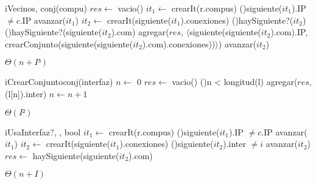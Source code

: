 \begin{Algoritmos}
  \begin{algoritmo}{iVecinos}{, }{conj(compu)}{}
    $res \gets$ vacio() 
     $it_{1} \gets$ crearIt(r.compus) 
    \While(){siguiente($it_{1}$).IP $\neq c$.IP}{
      avanzar($it_{1}$) 
    }
     $it_{2} \gets$ crearIt(siguiente($it_{1}$).conexiones) 
    \While(){haySiguiente?($it_{2}$)}{
      \If(){haySiguiente?(siguiente($it_{2}$).com)}{
        agregar($res$, $\langle$siguiente(siguiente($it_{2}$).com).IP, crearConjunto(siguiente(siguiente($it_{2}$).com).conexiones))$\rangle$)
      }
      avanzar($it_{2}$)
    }
  \end{algoritmo}
   \datosAlgoritmo{} %
  {} %
  {} %
  {$\Theta(n+I³)$} %
  {} %
  
   \begin{algoritmo}{iCrearConjunto}{}{conj(interfaz)}{}
     $n \gets$ 0
    $res \gets$ vacio()
   \While(){n < longitud(l)}{
      agregar($res$, (l[n]).inter)
      $n \gets n+1$
    }
  \end{algoritmo} 
  {} %
  {} %
  {$\Theta(I²)$} %
  {} %

  \begin{algoritmo}{iUsaInterfaz?}{, , }{bool}{}
     $it_{1} \gets$ crearIt(r.compus)
    \While(){siguiente($it_{1}$).IP $\neq c$.IP}{
      avanzar($it_{1}$)
    }
     $it_{2} \gets$ crearIt(siguiente($it_{1}$).conexiones)
    \While(){siguiente($it_{2}$).inter $\neq i$}{
     avanzar($it_{2}$)
    }
    $res \gets$ haySiguiente(siguiente($it_{2}$).com)
  \end{algoritmo} \datosAlgoritmo{} %
  {} %
  {} %
  {$\Theta(n+I)$} %
  {} %
   

\end{Algoritmos}
